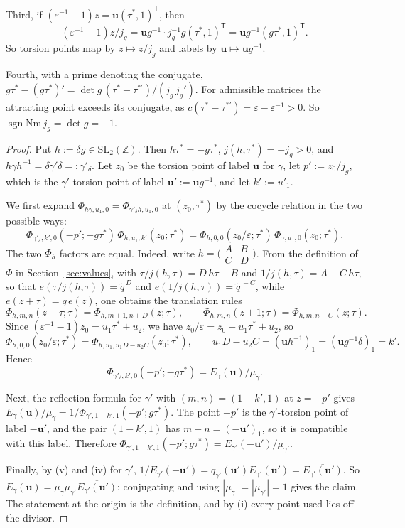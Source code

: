 \documentclass[11pt]{amsart}
\numberwithin{equation}{section}
\theoremstyle{plain}
\theoremstyle{definition}
\theoremstyle{remark}
\newcommand{\C}{\mathbb{C}}
\begin{document}
Third, if \((\varepsilon^{-1}-1)z=\mathbf u(\tau^*,1)^{\mathsf T}\), then
\[(\varepsilon^{-1}-1)z/j_g=\mathbf ug^{-1}\cdot j_g^{-1}g(\tau^*,1)^{\mathsf T}=\mathbf ug^{-1}(g\tau^*,1)^{\mathsf T}.\]
So torsion points map by \(z\mapsto z/j_g\) and labels by \(\mathbf u\mapsto\mathbf ug^{-1}\).

Fourth, with a prime denoting the conjugate, \(g\tau^*-(g\tau^*)'=\det g\,(\tau^*-\tau^{*\prime})/(j_g\,j_g')\). For admissible matrices the attracting point exceeds its conjugate, as \(c(\tau^*-\tau^{*\prime})=\varepsilon-\varepsilon^{-1}>0\). So \(\operatorname{sgn}\mathrm{Nm}\,j_g=\det g=-1\).

\begin{proof}
Put \(h:=\delta g\in\mathrm{SL}_2(\mathbb Z)\). Then \(h\tau^*=-g\tau^*\), \(j(h,\tau^*)=-j_g>0\), and \(h\gamma h^{-1}=\delta\gamma'\delta=:\gamma'_\delta\). Let \(z_0\) be the torsion point of label \(\mathbf u\) for \(\gamma\), let \(p':=z_0/j_g\), which is the \(\gamma'\)-torsion point of label \(\mathbf u':=\mathbf ug^{-1}\), and let \(k':=u'_1\).

We first expand \(\Phi_{h\gamma,u_1,0}=\Phi_{\gamma'_\delta h,u_1,0}\) at \((z_0,\tau^*)\) by the cocycle relation in the two possible ways:
\[\Phi_{\gamma'_\delta,k',0}(-p';-g\tau^*)\,\Phi_{h,u_1,k'}(z_0;\tau^*)=\Phi_{h,0,0}(z_0/\varepsilon;\tau^*)\,\Phi_{\gamma,u_1,0}(z_0;\tau^*).\]
The two \(\Phi_h\) factors are equal. Indeed, write \(h=\bigl(\begin{smallmatrix}A&B\\C&D\end{smallmatrix}\bigr)\). From the definition of \(\Phi\) in Section~\ref{sec:values}, with \(\tau/j(h,\tau)=D\,h\tau-B\) and \(1/j(h,\tau)=A-C\,h\tau\), so that \(e(\tau/j(h,\tau))=\tilde q^{\,D}\) and \(e(1/j(h,\tau))=\tilde q^{\,-C}\), while \(e(z+\tau)=q\,e(z)\), one obtains the translation rules
\[\Phi_{h,m,n}(z+\tau;\tau)=\Phi_{h,m+1,n+D}(z;\tau),\qquad \Phi_{h,m,n}(z+1;\tau)=\Phi_{h,m,n-C}(z;\tau).\]
Since \((\varepsilon^{-1}-1)z_0=u_1\tau^*+u_2\), we have \(z_0/\varepsilon=z_0+u_1\tau^*+u_2\), so
\[\Phi_{h,0,0}(z_0/\varepsilon;\tau^*)=\Phi_{h,u_1,u_1D-u_2C}(z_0;\tau^*),\qquad u_1D-u_2C=(\mathbf uh^{-1})_1=(\mathbf ug^{-1}\delta)_1=k'.\] Hence
\[\Phi_{\gamma'_\delta,k',0}(-p';-g\tau^*)=E_\gamma(\mathbf u)/\mu_\gamma.\]

Next, the reflection formula for \(\gamma'\) with \((m,n)=(1-k',1)\) at \(z=-p'\) gives \(E_\gamma(\mathbf u)/\mu_\gamma=1/\Phi_{\gamma',1-k',1}(-p';g\tau^*)\). The point \(-p'\) is the \(\gamma'\)-torsion point of label \(-\mathbf u'\), and the pair \((1-k',1)\) has \(m-n=(-\mathbf u')_1\), so it is compatible with this label. Therefore \(\Phi_{\gamma',1-k',1}(-p';g\tau^*)=E_{\gamma'}(-\mathbf u')/\mu_{\gamma'}\).

Finally, by (v) and (iv) for \(\gamma'\), \(1/E_{\gamma'}(-\mathbf u')=q_{\gamma'}(\mathbf u')E_{\gamma'}(\mathbf u')=\overline{E_{\gamma'}(\mathbf u')}\). So \(E_\gamma(\mathbf u)=\mu_\gamma\mu_{\gamma'}\overline{E_{\gamma'}(\mathbf u')}\); conjugating and using \(|\mu_\gamma|=|\mu_{\gamma'}|=1\) gives the claim. The statement at the origin is the definition, and by (i) every point used lies off the divisor.
\end{proof}
\end{document}
